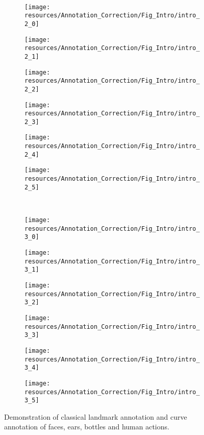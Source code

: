 \begin{figure}[h]
    \\
    \begin{subfigure}[b]{0.07\textwidth}
            \texttt{[image: resources/Annotation\_Correction/Fig\_Intro/intro\_2\_0]}
    \end{subfigure}
    \hfill
    \begin{subfigure}[b]{0.07\textwidth}
            \texttt{[image: resources/Annotation\_Correction/Fig\_Intro/intro\_2\_1]}
    \end{subfigure}
   	\hfill
    \begin{subfigure}[b]{0.07\textwidth}
            \texttt{[image: resources/Annotation\_Correction/Fig\_Intro/intro\_2\_2]}
    \end{subfigure}
    \hfill
    \begin{subfigure}[b]{0.07\textwidth}
            \texttt{[image: resources/Annotation\_Correction/Fig\_Intro/intro\_2\_3]}
    \end{subfigure}
    \hfill
    \begin{subfigure}[b]{0.07\textwidth}
            \texttt{[image: resources/Annotation\_Correction/Fig\_Intro/intro\_2\_4]}
    \end{subfigure}
   	\hfill
    \begin{subfigure}[b]{0.07\textwidth}
            \texttt{[image: resources/Annotation\_Correction/Fig\_Intro/intro\_2\_5]}
    \end{subfigure}
    \\
    \begin{subfigure}[b]{0.075\textwidth}
            \texttt{[image: resources/Annotation\_Correction/Fig\_Intro/intro\_3\_0]}
    \end{subfigure}
    \hfill
    \begin{subfigure}[b]{0.075\textwidth}
            \texttt{[image: resources/Annotation\_Correction/Fig\_Intro/intro\_3\_1]}
    \end{subfigure}
   	\hfill
    \begin{subfigure}[b]{0.075\textwidth}
            \texttt{[image: resources/Annotation\_Correction/Fig\_Intro/intro\_3\_2]}
    \end{subfigure}
    \hfill
    \begin{subfigure}[b]{0.075\textwidth}
            \texttt{[image: resources/Annotation\_Correction/Fig\_Intro/intro\_3\_3]}
    \end{subfigure}
    \hfill
    \begin{subfigure}[b]{0.075\textwidth}
            \texttt{[image: resources/Annotation\_Correction/Fig\_Intro/intro\_3\_4]}
    \end{subfigure}
   	\hfill
    \begin{subfigure}[b]{0.075\textwidth}
            \texttt{[image: resources/Annotation\_Correction/Fig\_Intro/intro\_3\_5]}
    \end{subfigure}
    \caption{Demonstration of classical landmark annotation and curve annotation of faces, ears, bottles and human actions.}
    \label{fig:intro}
\end{figure}

